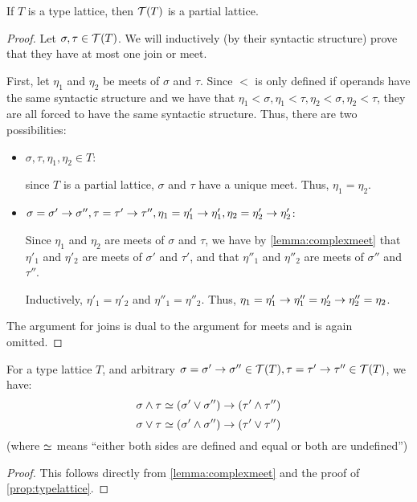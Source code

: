 \documentclass[main.tex]{subfiles}
\begin{document}
\begin{prop}
    \label{prop:typelattice}
    If $T$ is a type lattice, then $\mathcal{T}( T )$ is a partial lattice.
\end{prop}
\begin{proof}
    Let $\sigma, \tau \in \mathcal{T}( T )$. We will inductively (by their syntactic
    structure) prove that they have at most one join or meet.

    First, let $\eta_1$ and $\eta_2$ be meets of $\sigma$ and $\tau$.
    Since $\less$ is only defined if operands have the same syntactic structure
    and we have that $\eta_1 \less \sigma, \eta_1 \less \tau, \eta_2 \less \sigma, \eta_2 \less \tau$,
    they are all forced to have the same syntactic structure. Thus, there are
    two possibilities:

    \begin{itemize}
        \item $\sigma, \tau, \eta_1, \eta_2 \in T$:

            since $T$ is a partial
            lattice, $\sigma$ and $\tau$ have a unique meet. Thus, $\eta_1 = \eta_2$.
        \item $\sigma = \sigma' \rightarrow \sigma'', \tau = \tau' \rightarrow \tau'',
            \eta_1 = \eta'_1 \rightarrow \eta'_1, \eta_2 = \eta'_2 \rightarrow \eta'_2$:

            Since $\eta_1$ and $\eta_2$ are meets of $\sigma$ and $\tau$, we have
            by \cref{lemma:complexmeet} that $\eta'_1$ and $\eta'_2$ are meets
            of $\sigma'$ and $\tau'$, and that $\eta''_1$ and $\eta''_2$ are meets
            of $\sigma''$ and $\tau''$.

            Inductively, $\eta'_1 = \eta'_2$ and $\eta''_1 = \eta''_2$. Thus,
            $\eta_1 = \eta'_1 \rightarrow \eta''_1 = \eta'_2 \rightarrow \eta''_2 = \eta_2$.
    \end{itemize}

    The argument for joins is dual to the argument for meets and is again
    omitted.
\end{proof}

\begin{property}
    For a type lattice $T$, and arbitrary $\sigma = \sigma' \rightarrow \sigma'' \in \mathcal{T}( T )
    , \tau = \tau' \rightarrow \tau'' \in \mathcal{T}( T )$, we have:
    \[
        \sigma \wedge \tau \simeq (\sigma' \vee \sigma'') \rightarrow (\tau' \wedge \tau'')
    \]
    \[
        \sigma \vee \tau \simeq (\sigma' \wedge \sigma'') \rightarrow (\tau' \vee \tau'')
    \]
    (where $\simeq$ means ``either both sides are defined and equal or both are
    undefined'')
\end{property}
\begin{proof}
    This follows directly from \cref{lemma:complexmeet} and the proof of
    \cref{prop:typelattice}.
\end{proof}
\end{document}
